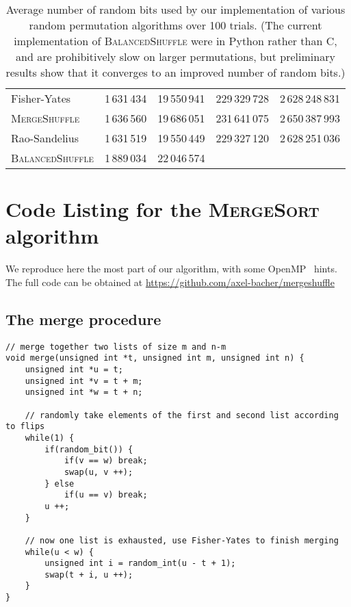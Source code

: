 \documentclass[letter,11pt,en]{quick-document}
\begin{document}
\begin{table}[t]
\begin{center}
\begin{tabular}{lrrrr}
  \toprule
  	        &	        &	        &	        &\\\midrule
  Fisher-Yates	&1\,631\,434	&19\,550\,941	&229\,329\,728	&2\,628\,248\,831\\
  \textsc{MergeShuffle}	&1\,636\,560	&19\,686\,051	&231\,641\,075	&2\,650\,387\,993\\
  Rao-Sandelius	        &1\,631\,519	&19\,550\,449	&229\,327\,120	&2\,628\,251\,036\\
  \textsc{BalancedShuffle}	&1\,889\,034	&22\,046\,574	&	        &\\
  \bottomrule
\end{tabular}
\end{center}
\caption{Average number of random bits used by our implementation of various
  random permutation algorithms over 100 trials. (The current implementation of
  \textsc{BalancedShuffle} were in Python rather than C, and are prohibitively
  slow on larger permutations, but preliminary results show that it converges
  to an improved number of random bits.) }
\end{table}






\newpage
\appendix

\section{Code Listing for the \textsc{MergeSort} algorithm}

We reproduce here the most part of our algorithm, with some
OpenMP~\cite{DaEn98, Chandra01} hints. The full code can be obtained at
\url{https://github.com/axel-bacher/mergeshuffle}

\subsection{The merge procedure}
\begin{lstlisting}
// merge together two lists of size m and n-m
void merge(unsigned int *t, unsigned int m, unsigned int n) {
    unsigned int *u = t;
    unsigned int *v = t + m;
    unsigned int *w = t + n;

    // randomly take elements of the first and second list according to flips
    while(1) {
        if(random_bit()) {
            if(v == w) break;
            swap(u, v ++);
        } else
            if(u == v) break;
        u ++;
    }

    // now one list is exhausted, use Fisher-Yates to finish merging
    while(u < w) {
        unsigned int i = random_int(u - t + 1);
        swap(t + i, u ++);
    }
}
\end{lstlisting}
\end{document}
